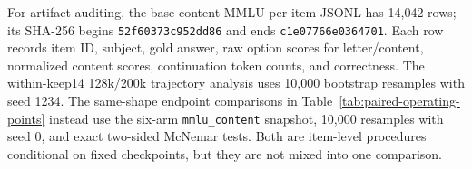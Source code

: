 For artifact auditing, the base content-MMLU per-item JSONL has 14,042 rows;
its SHA-256 begins \texttt{52f60373c952dd86} and ends
\texttt{c1e07766e0364701}. Each row records
item ID, subject, gold answer, raw option scores for letter/content, normalized
content scores, continuation token counts, and correctness. The within-keep14
128k/200k trajectory analysis uses 10,000 bootstrap resamples with seed 1234.
The same-shape endpoint comparisons in
Table~\ref{tab:paired-operating-points} instead use the six-arm
\texttt{mmlu\_content} snapshot, 10,000 resamples with seed 0, and exact
two-sided McNemar tests. Both are item-level procedures conditional on fixed
checkpoints, but they are not mixed into one comparison.


